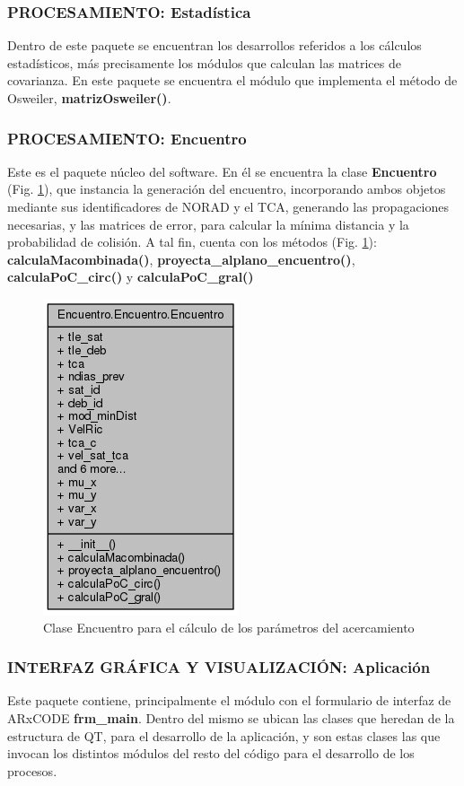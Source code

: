 \subsubsection*{PROCESAMIENTO: Estad\'istica}
Dentro de este paquete se encuentran los desarrollos referidos a los c\'alculos estad\'isticos, m\'as precisamente los m\'odulos que calculan las matrices de covarianza. En este paquete se encuentra el m\'odulo que implementa el m\'etodo de Osweiler, \citep{osweiler} {\bf{matrizOsweiler()}}.

\subsubsection*{PROCESAMIENTO: Encuentro}
Este es el paquete n\'ucleo del software. En \'el se encuentra la clase {\bf{Encuentro}}  (Fig. \ref{fig:claseencuentro}), que instancia la generaci\'on del encuentro, incorporando ambos objetos mediante sus identificadores de NORAD y el TCA, generando las propagaciones necesarias, y las matrices de error, para calcular la m\'inima distancia y la probabilidad de colisi\'on. A tal fin, cuenta con los m\'etodos (Fig. \ref{fig:claseencuentro}): {\bf{calculaMacombinada()}}, {\bf{proyecta\_alplano\_encuentro()}}, {\bf{calculaPoC\_circ()}} y  {\bf{calculaPoC\_gral()}}\\

\begin{figure}[h!]
  \centering
  \includegraphics[width=.3\textwidth]{imagenes/encuentroClass} 
  \caption[Clase Encuentro]{Clase Encuentro para el c\'alculo de los par\'ametros del acercamiento}
  \label{fig:claseencuentro}
\end{figure}


\subsubsection*{INTERFAZ GR\'AFICA Y VISUALIZACI\'ON: Aplicaci\'on}
Este paquete contiene, principalmente el m\'odulo con el formulario de interfaz de ARxCODE {\bf{frm\_main}}. Dentro del mismo se ubican las clases que heredan de la estructura de QT, para el desarrollo de la aplicaci\'on, y son estas clases las que invocan los distintos m\'odulos del resto del c\'odigo para el desarrollo de los procesos.\\

